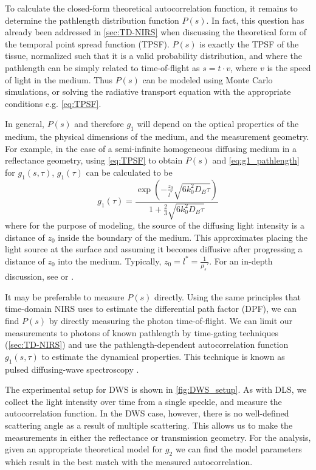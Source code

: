 To calculate the closed-form theoretical autocorrelation function, it remains to determine the pathlength distribution function $P(s)$. In fact, this question has already been addressed in \autoref{sec:TD-NIRS} when discussing the theoretical form of the temporal point spread function (TPSF). $P(s)$ is exactly the TPSF of the tissue, normalized such that it is a valid probability distribution, and where the pathlength can be simply related to time-of-flight as $s = t\cdot v$, where $v$ is the speed of light in the medium. Thus $P(s)$ can be modeled using Monte Carlo simulations, or solving the radiative transport equation with the appropriate conditions e.g. \autoref{eq:TPSF}. 

In general, $P(s)$ and therefore $g_1$ will depend on the optical properties of the medium, the physical dimensions of the medium, and the measurement geometry. For example, in the case of a semi-infinite homogeneous diffusing medium in a reflectance geometry, using \autoref{eq:TPSF} to obtain $P(s)$ and \autoref{eq:g1_pathlength} for $g_1(s, \tau)$, $g_1(\tau)$ can be calculated to be
\begin{equation}
g_1(\tau) = \frac{ \exp(-\frac{z_0}{l^*} \sqrt{6k_0^2D_B\tau}) }
                 { 1+ \frac{2}{3} \sqrt{6k_0^2D_B\tau}        }
\end{equation} 
where for the purpose of modeling, the source of the diffusing light intensity is a distance of $z_0$ inside the boundary of the medium. This approximates placing the light source at the surface and assuming it becomes diffusive after progressing a distance of $z_0$ into the medium. Typically, $z_0 = l^* = \frac{1}{\mu_s'}$. For an in-depth discussion, see \cite[Section 4]{Pine1990} or \cite[ch. 16.2.3.4]{Brown1993}.

It may be preferable to measure $P(s)$ directly. Using the same principles that time-domain NIRS uses to estimate the differential path factor (DPF), we can find $P(s)$ by directly measuring the photon time-of-flight. We can limit our measurements to photons of known pathlength by time-gating techniques (\autoref{sec:TD-NIRS}) and use the pathlength-dependent autocorrelation function $g_1(s,\tau)$ to estimate the dynamical properties. This technique is known as pulsed diffusing-wave spectroscopy \cite{Yodh1990}.  

The experimental setup for DWS is shown in \autoref{fig:DWS_setup}. As with DLS, we collect the light intensity over time from a single speckle, and measure the autocorrelation function. In the DWS case, however, there is no well-defined scattering angle as a result of multiple scattering. This allows us to make the measurements in either the reflectance or transmission geometry. For the analysis, given an appropriate theoretical model for $g_2$ we can find the model parameters which result in the best match with the measured autocorrelation. 

